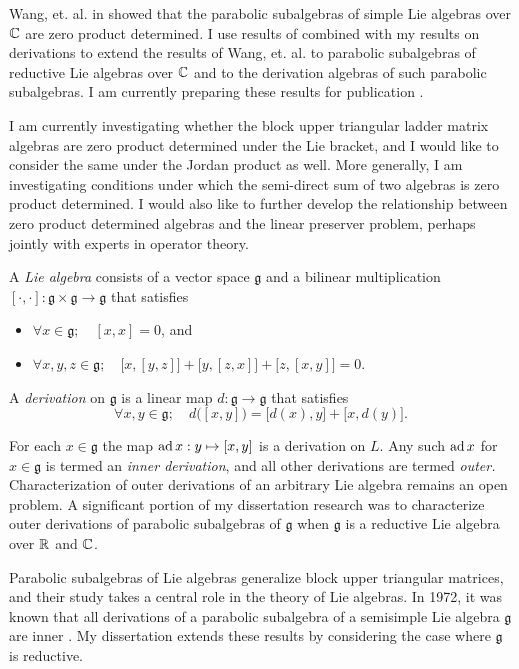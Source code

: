 \documentclass[11pt]{article}
\begin{document}
Wang, et. al. in \cite{wang2011class} showed that the parabolic
subalgebras of simple Lie algebras over $\mathbb{C}$ are zero product
determined. I use results of  \cite{article:brice2015zero} combined with
my results on derivations \cite{arxiv:brice2015derivations} to extend
the results of Wang, et. al. to parabolic subalgebras of reductive Lie
algebras over $\mathbb{C}$ and to the derivation algebras of such parabolic
subalgebras. I am currently preparing these results for publication
\cite{inprep:brice0000note}.

I am currently investigating whether the block upper triangular ladder
matrix algebras are zero product determined under the Lie bracket, and I
would like to consider the same under the Jordan product as well. More
generally, I am investigating conditions under which the semi-direct sum
of two algebras is zero product determined. I would also like to further
develop the relationship between zero product determined algebras and
the linear preserver problem, perhaps jointly with experts in operator
theory.


A \emph{Lie algebra} consists of a vector space $\mathfrak{g}$
and a bilinear multiplication
$[\cdot,\cdot]: \mathfrak{g} \times \mathfrak{g} \to \mathfrak{g}$
that satisfies
\begin{itemize}
	\item[] $\forall x \in \mathfrak{g};\quad [x,x] = 0$, and
	\item[] $\forall x,y,z \in \mathfrak{g};\quad
    \big[x,[y,z]\big]+\big[y,[z,x]\big]+\big[z,[x,y]\big]=0$.
\end{itemize}
A \emph{derivation} on $\mathfrak{g}$ is a linear map
$d: \mathfrak{g} \to \mathfrak{g}$ that satisfies
\[
  \forall x,y \in \mathfrak{g};\quad
  d\big([x,y]\big) = \big[d(x),y\big] + \big[x,d(y)\big]
  \text{.}
\]

For each $x \in \mathfrak{g}$ the map $\operatorname{ad} x : y \mapsto [x,y]$ is a
derivation on $L$. Any such $\operatorname{ad} x$ for $x \in \mathfrak{g}$ is termed
an \emph{inner derivation}, and all other derivations are termed
\emph{outer.} Characterization of outer derivations of an arbitrary Lie
algebra remains an open problem. A significant portion of my
dissertation research was to characterize outer derivations of parabolic
subalgebras of $\mathfrak{g}$ when $\mathfrak{g}$ is a reductive Lie
algebra over $\mathbb{R}$ and $\mathbb{C}$.

Parabolic subalgebras of Lie algebras generalize block upper triangular
matrices, and their study takes a central role in the theory of Lie
algebras. In 1972, it was known that all derivations of a parabolic
subalgebra of a semisimple Lie algebra $\mathfrak{g}$ are inner
\cite{leger1972cohomology}. My dissertation extends these results by
considering the case where $\mathfrak{g}$ is reductive.
\end{document}
